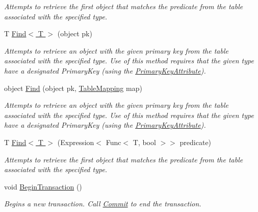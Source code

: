 \begin{DoxyCompactItemize}
\begin{DoxyCompactList}\small\item\em Attempts to retrieve the first object that matches the predicate from the table associated with the specified type. \end{DoxyCompactList}\item 
T \hyperlink{class_s_q_lite_1_1_s_q_lite_connection_adfe66fe8c304aca8575f07fc1c05d9f5}{Find$<$ T $>$} (object pk)
\begin{DoxyCompactList}\small\item\em Attempts to retrieve an object with the given primary key from the table associated with the specified type. Use of this method requires that the given type have a designated Primary\+Key (using the \hyperlink{class_s_q_lite_1_1_primary_key_attribute}{Primary\+Key\+Attribute}). \end{DoxyCompactList}\item 
object \hyperlink{class_s_q_lite_1_1_s_q_lite_connection_a95729c5ebf5fad75631109db91e7c14b}{Find} (object pk, \hyperlink{class_s_q_lite_1_1_table_mapping}{Table\+Mapping} map)
\begin{DoxyCompactList}\small\item\em Attempts to retrieve an object with the given primary key from the table associated with the specified type. Use of this method requires that the given type have a designated Primary\+Key (using the \hyperlink{class_s_q_lite_1_1_primary_key_attribute}{Primary\+Key\+Attribute}). \end{DoxyCompactList}\item 
T \hyperlink{class_s_q_lite_1_1_s_q_lite_connection_aeba2ae3cf5c1ffcb0c7eec7f8ccc64ca}{Find$<$ T $>$} (Expression$<$ Func$<$ T, bool $>$$>$ predicate)
\begin{DoxyCompactList}\small\item\em Attempts to retrieve the first object that matches the predicate from the table associated with the specified type. \end{DoxyCompactList}\item 
void \hyperlink{class_s_q_lite_1_1_s_q_lite_connection_aba3becdb524808bd49f349587f1b7049}{Begin\+Transaction} ()
\begin{DoxyCompactList}\small\item\em Begins a new transaction. Call \hyperlink{class_s_q_lite_1_1_s_q_lite_connection_a2c8187a19b5065f6b23c079e7cca29fe}{Commit} to end the transaction. \end{DoxyCompactList}\item 
$$
\end{DoxyCompactItemize}
